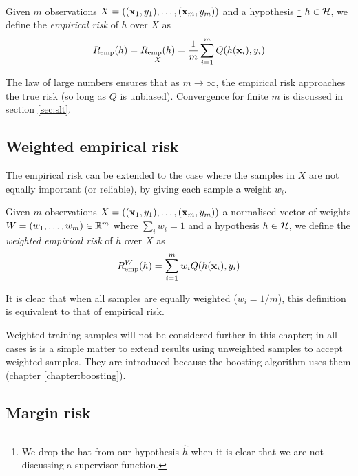 \begin{definition}
Given $m$ observations $X = ((\mathbf{x}_1, y_1), \ldots, (\mathbf{x}_m, y_m))$
and a hypothesis%
\footnote{We drop the hat from our hypothesis $\hat{h}$ when it is
clear that we are not discussing a supervisor function.}
$h \in \mathcal{H}$, we define the \emph{empirical risk} of $h$ over $X$ as
%
\begin{equation}
R_{\mathrm{emp}}(h) = \underset{X}{R_{\mathrm{emp}}(h)} = \frac{1}{m} \sum_{i=1}^{m}
Q(h(\mathbf{x}_i), y_i)
\end{equation}
\end{definition}

The law of large numbers ensures that as $m \rightarrow \infty$, the
empirical risk approaches the true risk (so long as $Q$ is unbiased).
Convergence for finite $m$ is discussed in section \ref{sec:slt}.


\subsection{Weighted empirical risk}
\label{sec:weighted empirical risk}

The empirical risk can be extended to the case where the samples in
$X$ are not equally important (or reliable), by giving each sample a
weight $w_i$.

\begin{definition}
\label{def:weighted empirical risk}
Given $m$ observations $X = ((\mathbf{x}_1, y_1), \ldots, (\mathbf{x}_m,
y_m))$ a normalised vector of weights $W = (w_1, \ldots, w_m) \in
\mathbb{R}^m$ where $\sum_{i} w_i = 1$ and a hypothesis $h \in
\mathcal{H}$, we define the \emph{weighted empirical risk} of $h$ over $X$ as 
%
\begin{equation}
R_{\mathrm{emp}}^W(h) = \sum_{i=1}^{m} w_i Q(h(\mathbf{x}_i), y_i)
\end{equation}
\end{definition}
%
It is clear that when all samples are equally weighted ($w_i = 1/m$),
this definition is equivalent to that of empirical risk.

Weighted training samples will not be considered further in this
chapter; in all cases is is a simple matter to extend results using
unweighted samples to accept weighted samples.  They are introduced
because the boosting algorithm uses them (chapter
\ref{chapter:boosting}).

\subsection{Margin risk}
\label{sec:margin risk}

